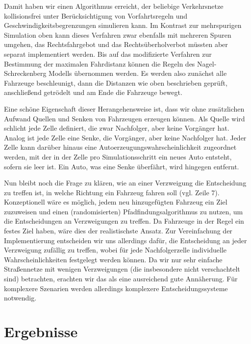 \documentclass[11pt, a4paper]{article}
\begin{document}
Damit haben wir einen Algorithmus erreicht, der beliebige Verkehrsnetze kollisionsfrei unter Berücksichtigung von Vorfahrtsregeln und Geschwindigkeitsbegrenzungen simulieren kann. Im Kontrast zur mehrspurigen Simulation oben kann dieses Verfahren zwar ebenfalls mit mehreren Spuren umgehen, das Rechtsfahrgebot und das Rechtsüberholverbot müssten aber separat implementiert werden. Bis auf das modifizierte Verfahren zur Bestimmung der maximalen Fahrdistanz können die Regeln des Nagel-Schreckenberg Modells \cite{nagel-schreckenberg} übernommen werden. Es werden also zunächst alle Fahrzeuge beschleunigt, dann die Distanzen wie oben beschrieben geprüft, anschließend getrödelt und am Ende die Fahrzeuge bewegt.

Eine schöne Eigenschaft dieser Herangehensweise ist, dass wir ohne zusätzlichen Aufwand Quellen und Senken von Fahrzeugen erzeugen können. Als Quelle wird schlicht jede Zelle definiert, die zwar Nachfolger, aber keine Vorgänger hat. Analog ist jede Zelle eine Senke, die Vorgänger, aber keine Nachfolger hat. Jeder Zelle kann darüber hinaus eine Autoerzeugungswahrscheinlichkeit zugeordnet werden, mit der in der Zelle pro Simulationsschritt ein neues Auto entsteht, sofern sie leer ist. Ein Auto, was eine Senke überfährt, wird hingegen entfernt.

Nun bleibt noch die Frage zu klären, wie an einer Verzweigung die Entscheidung zu treffen ist, in welche Richtung ein Fahrzeug fahren soll (vgl. Zeile 7). Konzeptionell wäre es möglich, jedem neu hinzugefügten Fahrzeug ein Ziel zuzuweisen und einen (randomisierten) Pfadfindungsalgorithmus zu nutzen, um die Entscheidungen an Verzweigungen zu treffen. Da Fahrzeuge in der Regel ein festes Ziel haben, wäre dies der realistischste Ansatz. Zur Vereinfachung der Implementierung entscheiden wir uns allerdings dafür, die Entscheidung an jeder Verzweigung zufällig zu treffen, wobei für jede Nachfolgerzelle individuelle Wahrscheinlichkeiten festgelegt werden können. Da wir nur sehr einfache Straßennetze mit wenigen Verzweigungen (die insbesondere nicht verschachtelt sind) betrachten, erachten wir das als eine ausreichend gute Annäherung. Für komplexere Szenarien werden allerdings komplexere Entscheidungssysteme notwendig.


\newpage
\section{Ergebnisse}
\label{sec:ergebnisse}
\end{document}
